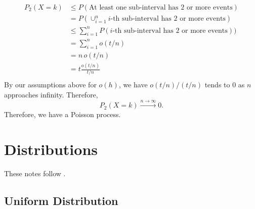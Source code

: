 \documentclass{article}
\begin{document}
\begin{align*}
    P_2(X = k) & \leq P(\text{At least one sub-interval has 2 or more events}) \\
    & = P(\cup_{i=1}^{n} \text{$i$-th sub-interval has 2 or more events}) \\
    & \leq \sum_{i=1}^{n} P(\text{$i$-th sub-interval has 2 or more events})) \\
    & = \sum_{i=1}^{n} o(t / n) \\
    & = n \, o(t / n) \\
    & = t \frac{o(t / n)}{t / n} \\
\end{align*}
By our assumptions above for $o(h)$, we have $o(t / n) / (t / n)$ tends to $0$ as $n$ approaches infinity. Therefore,
\begin{equation*}
    P_2(X = k) \xrightarrow{n \rightarrow{} \infty} 0.
\end{equation*}
Therefore, we have a Poisson process.

\section{Distributions}

These notes follow \cite{ross98}.

\subsection{Uniform Distribution}
\end{document}
